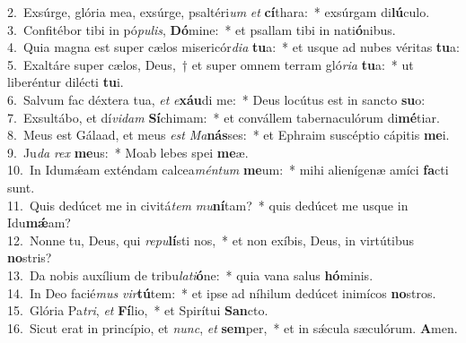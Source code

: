 {2.~}Exsúrge, glória mea, exsúrge, psaltéri\textit{um} \textit{et} \textbf{cí}thara:~* exsúrgam di\textbf{lú}culo.\\
{3.~}Confitébor tibi in pó\textit{pu}\textit{lis}, \textbf{Dó}mine:~* et psallam tibi in nati\textbf{ó}nibus.\\
{4.~}Quia magna est super cælos misericór\textit{di}\textit{a} \textbf{tu}a:~* et usque ad nubes véritas \textbf{tu}a:\\
{5.~}Exaltáre super cælos, Deus,~† et super omnem terram gló\textit{ri}\textit{a} \textbf{tu}a:~* ut liberéntur dilécti \textbf{tu}i.\\
{6.~}Salvum fac déxtera tua, \textit{et} \textit{e}\textbf{xáu}di me:~* Deus locútus est in sancto \textbf{su}o:\\
{7.~}Exsultábo, et dí\textit{vi}\textit{dam} \textbf{Sí}chimam:~* et convállem tabernaculórum di\textbf{mé}tiar.\\
{8.~}Meus est Gálaad, et meus \textit{est} \textit{Ma}\textbf{nás}ses:~* et Ephraim suscéptio cápitis \textbf{me}i.\\
{9.~}Ju\textit{da} \textit{rex} \textbf{me}us:~* Moab lebes spei \textbf{me}æ.\\
{10.~}In Idumǽam exténdam calcea\textit{mén}\textit{tum} \textbf{me}um:~* mihi alienígenæ amíci \textbf{fa}cti sunt.\\
{11.~}Quis dedúcet me in civitá\textit{tem} \textit{mu}\textbf{ní}tam?~* quis dedúcet me usque in Idu\textbf{mǽ}am?\\
{12.~}Nonne tu, Deus, qui \textit{re}\textit{pu}\textbf{lí}sti nos,~* et non exíbis, Deus, in virtútibus \textbf{no}stris?\\
{13.~}Da nobis auxílium de tribu\textit{la}\textit{ti}\textbf{ó}ne:~* quia vana salus \textbf{hó}minis.\\
{14.~}In Deo facié\textit{mus} \textit{vir}\textbf{tú}tem:~* et ipse ad níhilum dedúcet inimícos \textbf{no}stros.\\
{15.~}Glória Pa\textit{tri}, \textit{et} \textbf{Fí}lio,~* et Spirítui \textbf{San}cto.\\
{16.~}Sicut erat in princípio, et \textit{nunc}, \textit{et} \textbf{sem}per,~* et in sǽcula sæculórum. \textbf{A}men.\\
